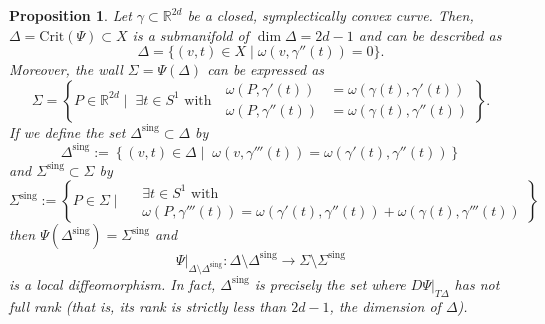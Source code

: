 \documentclass[12pt]{article}
\newtheorem{proposition}[lemma]{Proposition}
\newcommand{\R}{{\mathbb R}}
\begin{document}
\begin{proposition}\label{prop:properties_Delta_Sigma_symp_convex_curve}
Let $\gamma \subset \R^{2d}$ be a closed, symplectically convex curve. Then, $\Delta=\mathrm{Crit}(\Psi)\subset X$ is a submanifold of $\dim\Delta=2d-1$ and can be described as 
\begin{equation}\label{eq:Delta}
\Delta=\{(v,t)\in X\mid \omega(v,\gamma''(t))=0\}.
\end{equation}
Moreover, the wall $\Sigma=\Psi(\Delta)$ can be expressed as
\begin{equation}\label{eq:wall}
\Sigma=\left\{P\in\R^{2d}\;\Bigg| \;\;\exists t\in S^1\text{ with }\;
\begin{aligned}
\omega(P,\gamma'(t))&=\omega(\gamma(t),\gamma'(t))\\ 
\omega(P,\gamma''(t))&=\omega(\gamma(t),\gamma''(t)) 
\end{aligned}
\right\}.
\end{equation}
If we define the set $\Delta^{\mathrm{sing}}\subset\Delta$ by
\begin{equation}\nonumber
\Delta^{\mathrm{sing}}:=\left\{(v,t)\in\Delta\;\Big| \;\; \omega(v,\gamma'''(t))=\omega(\gamma'(t),\gamma''(t))\right\}
\end{equation}
and $\Sigma^{\mathrm{sing}}\subset\Sigma$ by
\begin{equation} \label{eq:third}
\Sigma^{\mathrm{sing}}:=\left\{P\in\Sigma\;\Bigg| \;\;
\begin{aligned}
&\exists t\in S^1\text{ with }\\
&\omega(P,\gamma'''(t))=\omega(\gamma'(t),\gamma''(t)) +\omega(\gamma(t),\gamma'''(t)) 
\end{aligned}
\right\}
\end{equation}
then $\Psi(\Delta^{\mathrm{sing}})=\Sigma^{\mathrm{sing}}$ and
\begin{equation}\nonumber
\Psi|_{\Delta\setminus\Delta^{\mathrm{sing}}}:\Delta\setminus\Delta^{\mathrm{sing}}\to\Sigma\setminus\Sigma^{\mathrm{sing}}
\end{equation}
is a local diffeomorphism. In fact, $\Delta^{\mathrm{sing}}$ is precisely the set where $D\Psi|_{T\Delta}$ has not full rank (that is, its rank is strictly less than $2d-1$, the dimension of $\Delta$). 
\end{proposition}
\end{document}
